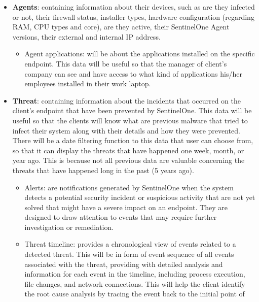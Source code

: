 \begin{itemize}
      \item \textbf{Agents}: containing information about their devices, such as are they infected or not, their firewall status, installer
            types, hardware configuration (regarding RAM, CPU types and core), are they active, their SentinelOne Agent versions, their external and
            internal IP address.
            \begin{itemize}
                  \item Agent applications: will be about the applications installed on the specific endpoint. This data will be useful so that the manager
                        of client's company can see and have access to what kind of applications his/her employees installed in their work laptop.
            \end{itemize}
      \item \textbf{Threat}: containing information about the incidents that occurred on the client's endpoint that have been prevented by SentinelOne.
            This data will be useful so that the clients will know what are previous malware that tried to infect their system along with their details and
            how they were prevented. There will be a date filtering function to this data that user can choose from, so that it can display the threats that have
            happened one week, month, or year ago. This is because not all previous data are valuable concerning the threats that have happened long in the past
            (5 years ago).
            \begin{itemize}
                  \item Alerts: are notifications generated by SentinelOne when the system detects a potential security incident or suspicious activity that
                        are not yet solved that might have a severe impact on an endpoint. They are designed to draw attention to events that may require further
                        investigation or remediation.
                  \item Threat timeline: provides a chronological view of events related to a detected threat. This will be in form of event sequence of all events
                        associated with the threat, providing with detailed analysis and information for each event in the timeline, including process execution, file
                        changes, and network connections. This will help the client identify the root cause analysis by tracing the event back to the initial point of

\end{itemize}
\end{itemize}
